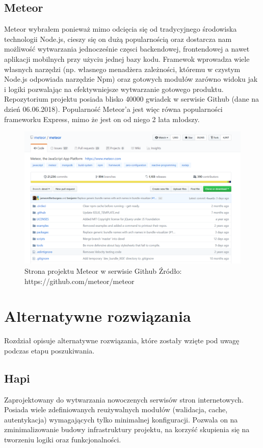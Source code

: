 \documentclass[12pt]{report}
\begin{document}
    \subsection{Meteor}
      Meteor wybrałem ponieważ mimo odcięcia się od tradycyjnego środowiska technologii Node.js, cieszy się on dużą popularnością oraz dostarcza nam możliwość wytwarzania jednocześnie częsci backendowej, frontendowej a nawet aplikacji mobilnych przy użyciu jednej bazy kodu.
      Framewok wprowadza wiele własnych narzędzi (np. własnego menadżera zależności, któremu w czystym Node.js odpowiada narzędzie Npm) oraz gotowych modułów zarówno widoku jak i logiki pozwalając na efektywniejsze wytwarzanie gotowego produktu.
      Repozytorium projektu posiada blisko 40000 gwiadek w serwisie Github (dane na dzień 06.06.2018).
      Popularność Meteor'a jest więc równa popularności frameworku Express, mimo że jest on od niego 2 lata młodszy.
      \begin{figure}[!hb]
        \centering
        \includegraphics[width=\textwidth,height=\textheight,keepaspectratio]{meteor.png} 
        \caption{Strona projektu Meteor w serwisie Github \newline Źródło: https://github.com/meteor/meteor}
      \end{figure}
  
  \section{Alternatywne rozwiązania}
    Rozdział opisuje alternatywne rozwiązania, które zostały wzięte pod uwagę podczas etapu poszukiwania.

    \subsection{Hapi}
    Zaprojektowany do wytwarzania nowoczenych serwisów stron internetowych.
    Posiada wiele zdefiniowanych reużywalnych modułów (walidacja, cache, autentykacja) wymagających tylko minimalnej konfiguracji.
    Pozwala on na zminimalizowanie budowy infrastruktury projektu, na korzyść skupienia się na tworzeniu logiki oraz funkcjonalności.
\end{document}
